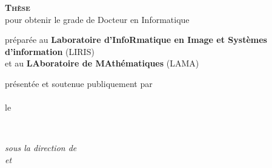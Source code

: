 \begin{titlepage}
	\begin{addmargin}[-3.5cm]{-3cm}
    \begin{center}
        \large

        \hfill

        \textsc{\Large\textbf{Thèse}}\\
        pour obtenir le grade de {Docteur} en {Informatique} \\ \bigskip



        préparée au \textbf{\normalsize Laboratoire d'InfoRmatique en Image et Systèmes d'information} (LIRIS)\\%
        et au \textbf{\normalsize LAboratoire de MAthématiques} (LAMA)\\ \bigskip %


        présentée et soutenue publiquement par \\
        \textsc{\Large\textbf{\sayMyName}} \\
        le \textsc{\thesisDate}

        \vfill

        \begingroup
            \color{Maroon}\huge{\textsc{\thesisTitle}} \\ %
        \endgroup



        \vfill

        \textit{sous la direction de \\
        \textbf{\thesisFirstSupervisor} et \textbf{\thesisSecondSupervisor}} \\ \bigskip



        \vfill


\end{center}
\end{addmargin}
\end{titlepage}
